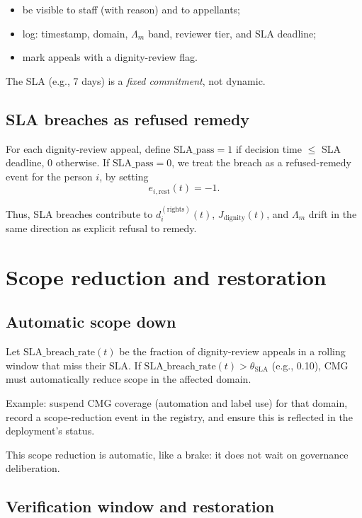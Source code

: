 \documentclass[11pt]{article}
\begin{document}
\begin{itemize}[leftmargin=*]
  \item be visible to staff (with reason) and to appellants;
  \item log: timestamp, domain, \(\Lambda_m\) band, reviewer tier, and SLA deadline;
  \item mark appeals with a dignity-review flag.
\end{itemize}

The SLA (e.g., 7 days) is a \emph{fixed commitment}, not dynamic.

\subsection{SLA breaches as refused remedy}

For each dignity-review appeal, define \(\text{SLA\_pass}=1\) if decision time \(\le\) SLA deadline, 0 otherwise.
If \(\text{SLA\_pass}=0\), we treat the breach as a refused-remedy event for the person \(i\), by setting
\[
e_{i,\text{rest}}(t) = -1.
\]

Thus, SLA breaches contribute to \(d_i^{(\text{rights})}(t)\), \(J_{\text{dignity}}(t)\), and \(\Lambda_m\) drift in the same direction as explicit refusal to remedy.

\section{Scope reduction and restoration}

\subsection{Automatic scope down}

Let \(\text{SLA\_breach\_rate}(t)\) be the fraction of dignity-review appeals in a rolling window that miss their SLA.
If \(\text{SLA\_breach\_rate}(t) > \theta_{\text{SLA}}\) (e.g., 0.10), CMG must automatically reduce scope in the affected domain.

Example: suspend CMG coverage (automation and label use) for that domain, record a scope-reduction event in the registry, and ensure this is reflected in the deployment's status.

This scope reduction is automatic, like a brake: it does not wait on governance deliberation.

\subsection{Verification window and restoration}
\end{document}
